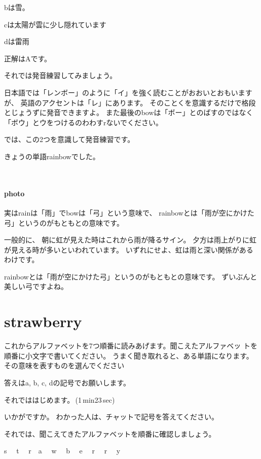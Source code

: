 \documentclass[12pt]{jlreq}
\begin{document}
bは雪。

cは太陽が雲に少し隠れています

dは雷雨


正解はAです。

それでは発音練習してみましょう。

日本語では「レンボー」のように「イ」を強く読むことがおおいとおもいますが、
英語のアクセントは「レ」にあります。
そのことくを意識するだけで格段とじょうずに発音できますよ。
また最後のbowは「ボー」とのばすのではなく「ボウ」とウをつけるのわわすrないでください。

では、この2つを意識して発音練習です。

きょうの単語rainbowでした。

{\large \ComputerMouse}\,\,


\paragraph{photo}

実はrainは「雨」でbowは「弓」という意味で、
rainbowとは「雨が空にかけた弓」というのがもともとの意味です。

一般的に、
朝に虹が見えた時はこれから雨が降るサイン。
夕方は雨上がりに虹が見える時が多いといわれています。
いずれにせよ、虹は雨と深い関係があるわけです。

rainbowとは「雨が空にかけた弓」というのがもともとの意味です。
ずいぶんと美しい弓ですよね。

\newpage
\section{strawberry}

これからアルファベットを7つ順番に読みあげます。聞こえたアルファベッ
トを順番に小文字で書いてください。
うまく聞き取れると、ある単語になります。
その意味を表すものを選んでください

答えはa, b, c, dの記号でお願いします。

それでははじめます。\faVolumeUp\,(1\,min23\,sec)

いかがですか。
わかった人は、チャットで記号を答えてください。

それでは、聞こえてきたアルファベットを順番に確認しましょう。{\large \ComputerMouse}

s\,\,
{\large \ComputerMouse}\,\,
t\,\,
{\large \ComputerMouse}\,\,
r
{\large \ComputerMouse}\,\,
a\,\,
{\large \ComputerMouse}\,\,
w\,\,
{\large \ComputerMouse}\,\,
b\,\,
{\large \ComputerMouse}\,\,
e\,\,
{\large \ComputerMouse}\,\,
r\,\,
{\large \ComputerMouse}\,\,
r\,\,
{\large \ComputerMouse}\,\,
y\,\,
{\large \ComputerMouse}\,\,
\end{document}
